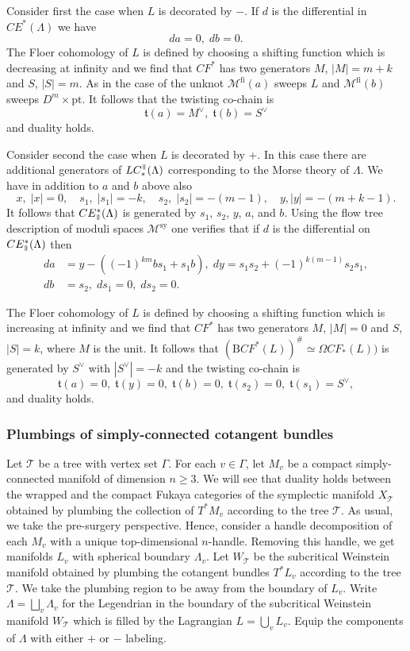 \documentclass{gtpart}
\renewcommand{\t}{\mathfrak{t}}
\renewcommand{\Bar}{\mathrm{B}}
\newcommand{\fl}{\mathrm{fi}}
\newcommand{\sy}{\mathrm{sy}}
\renewcommand{\parallel}{{\mkern3mu\vphantom{\perp}\vrule depth 0pt\mkern2mu\vrule depth
0pt\mkern3mu}}
\begin{document}
Consider first the case when $L$ is decorated by $-$. If $d$ is the differential in 
$CE^{\ast}(\Lambda)$ we have
\[ 
da = 0,\; db=0.
\]
The Floer cohomology of $L$ is defined by choosing a shifting function which is decreasing at infinity and we find that $CF^{\ast}$ has two generators $M$, $|M|=m+k$ and $S$, $|S|=m$. As in the case of the unknot $\mathcal{M}^{\fl}(a)$ sweeps $L$ and $\mathcal{M}^{\fl}(b)$ sweeps $D^{m}\times \mathrm{pt}$. It follows that the twisting co-chain is
\[ 
\t(a)=M^{\vee},\; \t(b)=S^{\vee}
\] 
and duality holds.

Consider second the case when $L$ is decorated by $+$. In this case there are additional generators of $LC_{\ast}^{\parallel}(\Lambda)$ corresponding to the Morse theory of $\Lambda$. We have in addition to $a$ and $b$ above also
\[ 
x,\;|x|=0,\quad s_{1},\;|s_{1}|=-k,\quad  s_{2},\;|s_{2}|=-(m-1),\quad y,|y|=-(m+k-1).
\]
It follows that $CE^{\ast}_{\parallel}(\Lambda)$ is generated by $s_{1}$, $s_{2}$, $y$, $a$, and $b$. Using the flow tree description of moduli spaces $\mathcal{M}^{\sy}$ one verifies that if $d$ is the differential on $CE^{\ast}_{\parallel}(\Lambda)$ then
\begin{align*} 
d a &=y - ((-1)^{km}bs_{1}+s_{1}b),\; dy = s_{1}s_{2} + (-1)^{k(m-1)}s_{2}s_{1},\\
db &=s_{2},\; ds_{1}=0,\; ds_{2}=0.
\end{align*}

The Floer cohomology of $L$ is defined by choosing a shifting function which is increasing at
infinity and we find that $CF^{\ast}$ has two generators $M$, $|M|=0$ and $S$, $|S|=k$, where
$M$
is the unit. It follows that $(\Bar CF^{\ast}(L))^\# \simeq \Omega CF_{\ast}(L))$ is generated by
$S^{\vee}$ with $|S^{\vee}|=-k$ and the twisting co-chain is
\[ 
\t(a)=0,\; \t(y) = 0,\; \t(b)=0,\; \t(s_{2})=0,\;\t(s_{1})=S^{\vee},
\] 
and duality holds.

\subsubsection{Plumbings of simply-connected cotangent bundles} 

Let $\mathcal{T}$ be a tree with vertex set $\Gamma$. For each $v \in \Gamma$, let $M_v$ be a compact
simply-connected manifold of dimension $n \geq 3$. We will see that duality holds between
the wrapped and the compact Fukaya categories of the symplectic manifold $X_\mathcal{T}$
obtained by plumbing the collection of $T^*M_v$ according to the tree $\mathcal{T}$. As usual, we take the pre-surgery
perspective. Hence, consider a handle decomposition of each $M_v$ with a unique top-dimensional $n$-handle. Removing this handle, we get manifolds $L_v$ with spherical boundary $\Lambda_v$. Let
$W_{\mathcal{T}}$ be the subcritical
Weinstein manifold obtained by plumbing the cotangent bundles $T^*L_v$ according to the tree
$\mathcal{T}$. We take the plumbing region to be away from the boundary of $L_v$. Write $\Lambda =
\bigsqcup_v \Lambda_v$ for the Legendrian in the boundary of the subcritical Weinstein manifold
$W_\mathcal{T}$ which is filled by the Lagrangian $L=\bigcup_{v} L_{v}$.
Equip the components of $\Lambda$ with either $+$ or $-$ labeling. 
\end{document}
